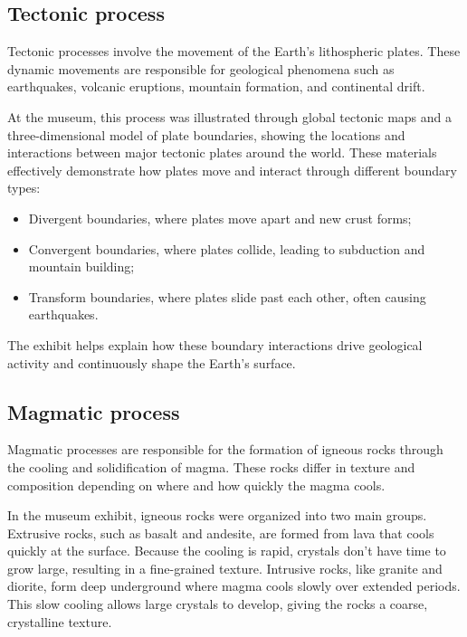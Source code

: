 \subsection{Tectonic process}
\label{subsec:tectonic-process}

Tectonic processes involve the movement of the Earth's lithospheric plates. These dynamic movements are responsible for geological phenomena such as earthquakes, volcanic eruptions, mountain formation, and continental drift.

At the museum, this process was illustrated through global tectonic maps and a three-dimensional model of plate boundaries, showing the locations and interactions between major tectonic plates around the world. These materials effectively demonstrate how plates move and interact through different boundary types:

\begin{itemize}
  \item Divergent boundaries, where plates move apart and new crust forms;
  \item Convergent boundaries, where plates collide, leading to subduction and mountain building;
  \item Transform boundaries, where plates slide past each other, often causing earthquakes.
\end{itemize}

The exhibit helps explain how these boundary interactions drive geological activity and continuously shape the Earth's surface.

\subsection{Magmatic process}
\label{subsec:magmatic-process}

Magmatic processes are responsible for the formation of igneous rocks through the cooling and solidification of magma. These rocks differ in texture and composition depending on where and how quickly the magma cools.

In the museum exhibit, igneous rocks were organized into two main groups. Extrusive rocks, such as basalt and andesite, are formed from lava that cools quickly at the surface. Because the cooling is rapid, crystals don't have time to grow large, resulting in a fine-grained texture. Intrusive rocks, like granite and diorite, form deep underground where magma cools slowly over extended periods. This slow cooling allows large crystals to develop, giving the rocks a coarse, crystalline texture.

